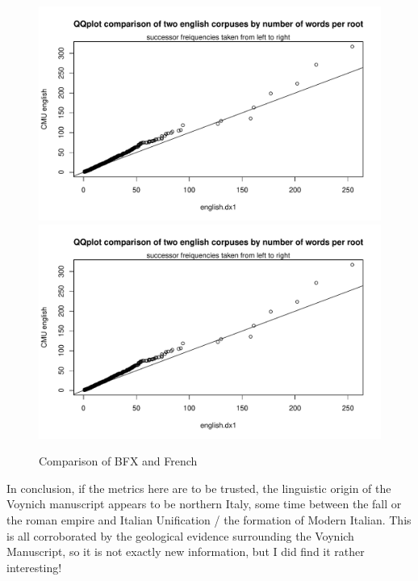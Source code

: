 \documentclass{article}
\begin{document}
		\begin{figure}[H]
		\centering
		\caption{Comparison of BFX and French}
		\includegraphics[scale=.7,page=25]{plots.pdf}
		\includegraphics[scale=.7,page=26]{plots.pdf}
		\end{figure}

In conclusion, if the metrics here are to be trusted, the linguistic origin of the Voynich manuscript appears to be northern Italy, some time between the fall or the roman empire and Italian Unification / the formation of Modern Italian. This is all corroborated by the geological evidence surrounding the Voynich Manuscript, so it is not exactly new information, but I did find it rather interesting! 
\end{document}
